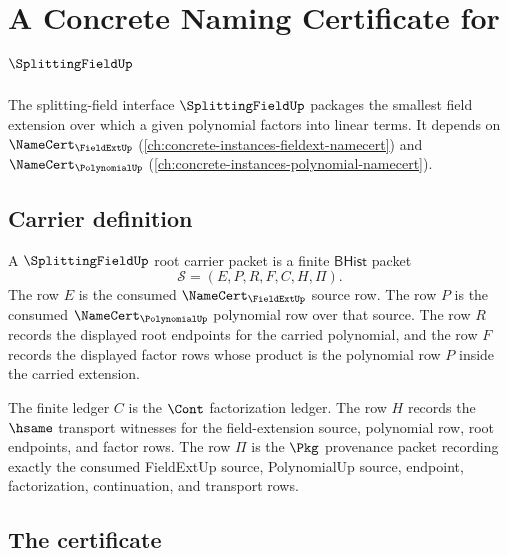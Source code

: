 \chapter{A Concrete Naming Certificate for $\SplittingFieldUp$}
\label{ch:concrete-instances-splittingfield-namecert}

The splitting-field interface $\SplittingFieldUp$ packages the smallest field extension over which a given polynomial factors into linear terms. It depends on $\NameCert_{\FieldExtUp}$ (\autoref{ch:concrete-instances-fieldext-namecert}) and $\NameCert_{\PolynomialUp}$ (\autoref{ch:concrete-instances-polynomial-namecert}).

\section{Carrier definition}
\label{sec:splittingfield-carrier}

\begin{definition}
\label{def:splittingfield-root-carrier-packet}
A $\SplittingFieldUp$ root carrier packet is a finite $\mathsf{BHist}$ packet
$$
\mathcal{S}=(E,P,R,F,C,H,\Pi).
$$
The row $E$ is the consumed $\NameCert_{\FieldExtUp}$ source row. The row
$P$ is the consumed $\NameCert_{\PolynomialUp}$ polynomial row over that
source. The row $R$ records the displayed root endpoints for the carried
polynomial, and the row $F$ records the displayed factor rows whose product
is the polynomial row $P$ inside the carried extension.

The finite ledger $C$ is the $\Cont$ factorization ledger. The row $H$
records the $\hsame$ transport witnesses for the field-extension source,
polynomial row, root endpoints, and factor rows. The row $\Pi$ is the
$\Pkg$ provenance packet recording exactly the consumed FieldExtUp source,
PolynomialUp source, endpoint, factorization, continuation, and transport
rows.
\end{definition}

\section{The certificate}
\label{sec:splittingfield-certificate}

